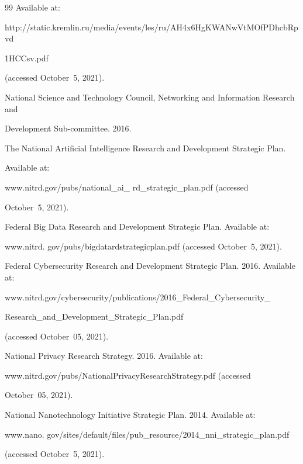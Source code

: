 {{\begin{thebibliography}{99}
Available at:


     {\sf


http://static.kremlin.ru/media/events/les/ru/AH4x6HgKWANwVtMOfPDhcbRpvd


1HCCsv.pdf} (accessed October~5, 2021).




     National Science and Technology Council, Networking and Information Research and


Development Sub-committee. 2016.


The National Artificial Intelligence Research and Development Strategic Plan.


Available at:


     {\sf www.nitrd.gov/pubs/national\_ai\_ rd\_strategic\_plan.pdf} (accessed


October~5, 2021).







Federal Big Data Research and Development Strategic Plan. Available at:


     {\sf www.nitrd. gov/pubs/bigdatardstrategicplan.pdf} (accessed October~5, 2021).




Federal Cybersecurity Research and Development Strategic Plan. 2016. Available at:


{\sf www.nitrd.gov/cybersecurity/publications/2016\_Federal\_Cybersecurity\_\linebreak 


Research\_and\_Development\_Strategic\_Plan.pdf}


 (accessed October~05, 2021).




National Privacy Research Strategy. 2016. Available at:


     {\sf www.nitrd.gov/pubs/\linebreak NationalPrivacyResearchStrategy.pdf} (accessed


October~05, 2021).




National Nanotechnology Initiative Strategic Plan. 2014. Available at:


     {\sf


www.nano. gov/sites/default/files/pub\_resource/2014\_nni\_strategic\_plan.pdf} (accessed October~5, 2021).



\end{thebibliography}}}
